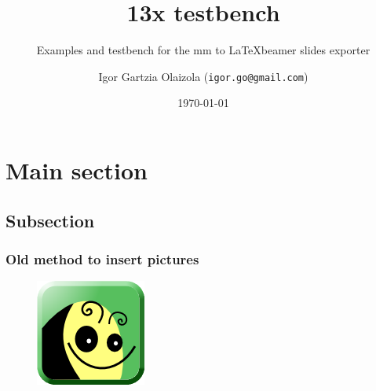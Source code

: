 \documentclass[usepdftitle=false,professionalfonts,compress ]{beamer}
\title{13x testbench}
\subtitle{Examples and testbench for the mm to \LaTeX beamer slides exporter}
\author{Igor Gartzia Olaizola (\texttt{igor.go@gmail.com})}
\institute{Freeplane}
\date{\today}
\begin{document}
\frame[plain]{
	\frametitle{}
	\titlepage
	\vspace{-0.5cm}
	\begin{center}
	\end{center}
}
\frame{
	\tableofcontents[hideallsubsections]
}





    
























































\section{Main section}
		
\subsection{Subsection}

{
\begin{frame}\frametitle{Old method to insert pictures}

\begin{figure}
	\includegraphics[height=0.8\textheight]{freeplane-logo-2014.png}\end{figure}
\end{frame}
}
\end{document}
